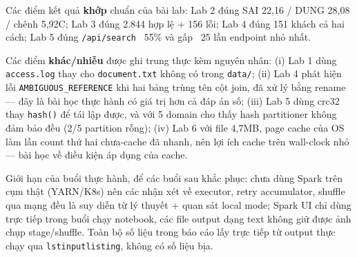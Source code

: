 \documentclass[12pt,a4paper,oneside]{article}
\begin{document}
Các điểm kết quả \textbf{khớp} chuẩn của bài lab: Lab 2 đúng SAI 22,16 / DUNG 28,08 / chênh 5,92\textdegree C; Lab 3 đúng 2.844 hợp lệ + 156 lỗi; Lab 4 đúng 151 khách cả hai cách; Lab 5 đúng \texttt{/api/search} ~55\% và gấp ~25 lần endpoint nhỏ nhất.

Các điểm \textbf{khác/nhiễu} được ghi trung thực kèm nguyên nhân: (i) Lab 1 dùng \texttt{access.log} thay cho \texttt{document.txt} không có trong \texttt{data/}; (ii) Lab 4 phát hiện lỗi \texttt{AMBIGUOUS\_REFERENCE} khi hai bảng trùng tên cột join, đã xử lý bằng rename --- đây là bài học thực hành có giá trị hơn cả đáp án số; (iii) Lab 5 dùng crc32 thay \texttt{hash()} để tái lập được, và với 5 domain cho thấy hash partitioner không đảm bảo đều (2/5 partition rỗng); (iv) Lab 6 với file 4,7MB, page cache của OS làm lần count thứ hai chưa-cache đã nhanh, nên lợi ích cache trên wall-clock nhỏ --- bài học về điều kiện áp dụng của cache.

Giới hạn của buổi thực hành, để các buổi sau khắc phục: chưa dùng Spark trên cụm thật (YARN/K8s) nên các nhận xét về executor, retry accumulator, shuffle qua mạng đều là suy diễn từ lý thuyết + quan sát local mode; Spark UI chỉ dùng trực tiếp trong buổi chạy notebook, các file output dạng text không giữ được ảnh chụp stage/shuffle. Toàn bộ số liệu trong báo cáo lấy trực tiếp từ output thực chạy qua \texttt{lstinputlisting}, không có số liệu bịa.
\end{document}
